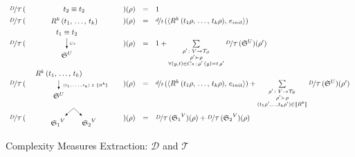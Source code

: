 \begin{figure}[t]
\[
\begin{array}{rclcl}
 \mathcal{\nicefrac{D}{T}}\,(&\parbox[m]{1.3cm}{\schemenode{$\unigoal{t_2}{t_2}$}}&)(\rho) &=& 1  \\

 \mathcal{\nicefrac{D}{T}}\,(&\parbox[m]{2.5cm}{\schemenode{$\invokegoal{R^k}{t_1}{t_k}$}}&)(\rho) &=& \nicefrac{d}{t}\,(\taskst{\invokegoal{R^k}{t_1 \rho}{t_k \rho}}{e_{init}}) \\

 \mathcal{\nicefrac{D}{T}}\,(&\parbox[m]{2cm}{\schemesarrow{$\unigoal{t_1}{t_2}$}{$Cs$}{$\schemewithvset{\mathfrak{S}}{U}$}} &)(\rho) &=& 1 +
      \sum\limits_{\substack{ \rho' \colon V \to \grterms \\
                                      \rho' \succ \rho \\
                                      \forall (y, t) \in Cs\,:\, \rho'\,(y) = t\, \rho'  }}
           \mathcal{\nicefrac{D}{T}}\,(\schemewithvset{\mathfrak{S}}{U})(\rho')  \\

 \mathcal{\nicefrac{D}{T}}\,(& \parbox[m]{4cm}{\schemedarrow{$\invokegoal{R^k}{t_1}{t_k}$}{ $(t_1, \dots, t_k) \in \sembr{R^k}  $}{$\schemewithvset{\mathfrak{S}}{U}$}} &)(\rho) &=&
      \nicefrac{d}{t}\,(\taskst{\invokegoal{R^k}{t_1 \rho}{t_k \rho}}{e_{init}}) +
      \sum\limits_{\substack{ \rho' \colon V \to \grterms \\
                                      \rho' \succ \rho \\
                                      (t_1 \rho', \dots, t_k \rho') \in \sembr{R^k}  }}
           \mathcal{\nicefrac{D}{T}}\,(\schemewithvset{\mathfrak{S}}{U})(\rho')  \\

 \mathcal{\nicefrac{D}{T}}\,(&\parbox[m]{2.5cm}{\schemefork{$\schemewithvset{\mathfrak{S}_1}{V}$}{$\schemewithvset{\mathfrak{S}_2}{V}$}}&)(\rho) &=&
 \mathcal{\nicefrac{D}{T}}\,(\schemewithvset{\mathfrak{S}_1}{V})(\rho) + \mathcal{\nicefrac{D}{T}}\,(\schemewithvset{\mathfrak{S}_2}{V})(\rho)
\end{array}
\]
\caption{Complexity Measures Extraction: $\mathcal D$ and $\mathcal T$}
\label{fig:scheduling_extraction_d_t}
\end{figure}


